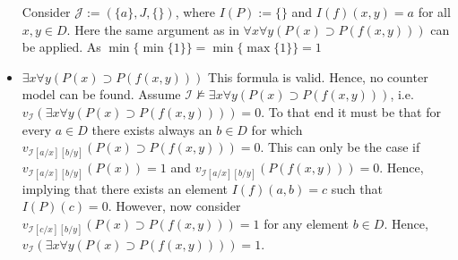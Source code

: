 \documentclass[11pt,a4paper]{article}
\begin{document}
\begin{itemize}
Consider $\mathcal{J}:=(\{a\}, J, \{\})$, where $I(P):=\{\}$ and $I(f)(x,y)=a$ for all $x,y \in D$.
Here the same argument as in  $\forall x \forall  y (P(x) \supset P(f(x,y)))$ can be applied. As $\min \{\min \{ 1 \} \} = \min \{\max \{ 1 \} \} = 1 $


\item  $\exists x \forall  y (P(x) \supset P(f(x,y)))$
This formula is valid. Hence, no counter model can be found. Assume $\mathcal{I} \nvDash \exists x \forall  y (P(x) \supset P(f(x,y)))$, i.e. $v_{\mathcal{I}}(\exists x \forall  y (P(x) \supset P(f(x,y))))=0$. To that end it must be that for every $a \in D$ there exists always an $b \in D$ for which $v_{\mathcal{I}[a/x][b/y]}(P(x) \supset P(f(x,y)))=0$. This can only be the case if $v_{\mathcal{I}[a/x][b/y]}(P(x))=1$ and $v_{\mathcal{I}[a/x][b/y]}(P(f(x,y)))=0$. Hence, implying that there exists an element $I(f)(a,b)=c$ such that $I(P)(c)=0$. However, now consider $v_{\mathcal{I}[c/x][b/y]}(P(x) \supset P(f(x,y)))=1$ for any element $b\in D$. Hence, $v_{\mathcal{I}}(\exists x \forall  y (P(x) \supset P(f(x,y))))=1$.


\end{itemize}
\end{document}
